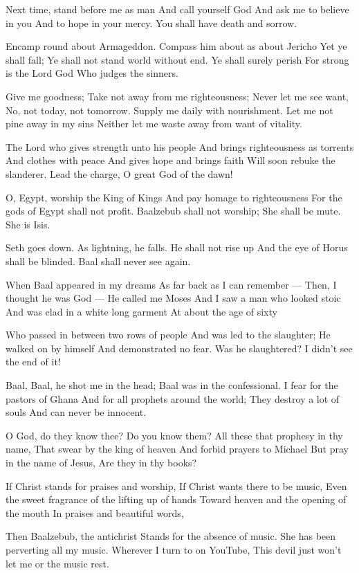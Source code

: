 \documentclass[
]{book}
\begin{document}
Next time, stand before me as man
And call yourself God
And ask me to believe in you
And to hope in your mercy.
You shall have death and sorrow.

Encamp round about Armageddon.
Compass him about as about Jericho
Yet ye shall fall;
Ye shall not stand world without end.
Ye shall surely perish
For strong is the Lord God
Who judges the sinners.

Give me goodness;
Take not away from me righteousness;
Never let me see want,
No, not today, not tomorrow.
Supply me daily with nourishment.
Let me not pine away in my sins
Neither let me waste away from want of vitality.

The Lord who gives strength unto his people
And brings righteousness as torrents
And clothes with peace
And gives hope and brings faith
Will soon rebuke the slanderer.
Lead the charge, O great God of the dawn!

O, Egypt, worship the King of Kings
And pay homage to righteousness
For the gods of Egypt shall not profit.
Baalzebub shall not worship;
She shall be mute.
She is Isis.

Seth goes down.
As lightning, he falls.
He shall not rise up
And the eye of Horus shall be blinded.
Baal shall never see again.

When Baal appeared in my dreams
As far back as I can remember ---
Then, I thought he was God ---
He called me Moses
And I saw a man who looked stoic
And was clad in a white long garment
At about the age of sixty

Who passed in between two rows of people
And was led to the slaughter;
He walked on by himself
And demonstrated no fear.
Was he slaughtered?
I didn't see the end of it!

Baal, Baal, he shot me in the head;
Baal was in the confessional.
I fear for the pastors of Ghana
And for all prophets around the world;
They destroy a lot of souls
And can never be innocent.

O God, do they know thee?
Do you know them?
All these that prophesy in thy name,
That swear by the king of heaven
And forbid prayers to Michael
But pray in the name of Jesus,
Are they in thy books?

If Christ stands for praises and worship,
If Christ wants there to be music,
Even the sweet fragrance of the lifting up of hands
Toward heaven and the opening of the mouth
In praises and beautiful words,

Then Baalzebub, the antichrist
Stands for the absence of music.
She has been perverting all my music.
Wherever I turn to on YouTube,
This devil just won't let me or the music rest.
\end{document}
